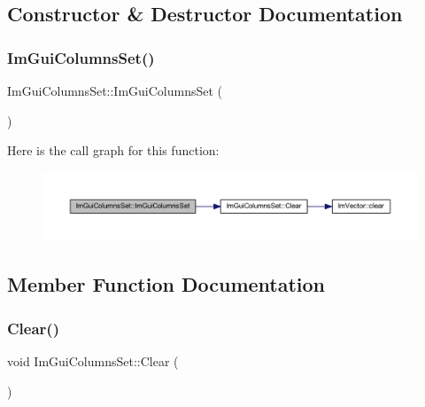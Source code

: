 \subsection{Constructor \& Destructor Documentation}
\mbox{\label{struct_im_gui_columns_set_a151a94550f1575639b6f8be0d63b7caa}} 
\subsubsection{\texorpdfstring{Im\+Gui\+Columns\+Set()}{ImGuiColumnsSet()}}
{\footnotesize\ttfamily Im\+Gui\+Columns\+Set\+::\+Im\+Gui\+Columns\+Set (\begin{DoxyParamCaption}{ }\end{DoxyParamCaption})\hspace{0.3cm}{\ttfamily [inline]}}

Here is the call graph for this function\+:
\nopagebreak
\begin{figure}[H]
\begin{center}
\leavevmode
\includegraphics[width=350pt]{struct_im_gui_columns_set_a151a94550f1575639b6f8be0d63b7caa_cgraph}
\end{center}
\end{figure}


\subsection{Member Function Documentation}
\mbox{\label{struct_im_gui_columns_set_acbaeb17ee3c2026ff36ecba69906eb6c}} 
\subsubsection{\texorpdfstring{Clear()}{Clear()}}
{\footnotesize\ttfamily void Im\+Gui\+Columns\+Set\+::\+Clear (\begin{DoxyParamCaption}{ }\end{DoxyParamCaption})\hspace{0.3cm}{\ttfamily [inline]}}

